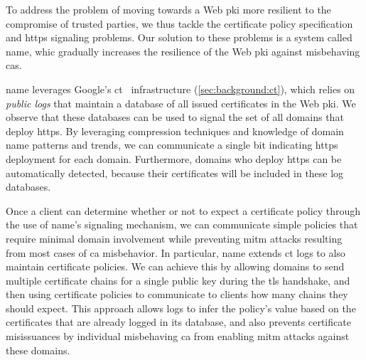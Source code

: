 
To address the problem of moving towards a Web \ac{pki} more resilient to the
compromise of trusted parties, we thus tackle the certificate policy
specification and \ac{https} signaling problems. Our solution to these problems
is a system called \ac{name}, whic gradually increases the resilience of the Web
\ac{pki} against misbehaving \acp{ca}.

\ac{name} leverages Google's \ac{ct}~\cite{rfc6698} infrastructure
(\autoref{sec:background:ct}), which relies on \emph{public logs} that maintain
a database of all issued certificates in the Web \ac{pki}. We observe that these
databases can be used to signal the set of all domains that deploy \ac{https}.
By leveraging compression techniques and knowledge of domain name patterns and
trends, we can communicate a single bit indicating \ac{https} deployment for
each domain. Furthermore, domains who deploy \ac{https} can be automatically
detected, because their certificates will be included in these log databases.

Once a client can determine whether or not to expect a certificate policy
through the use of \ac{name}'s signaling mechanism, we can communicate simple
policies that require minimal domain involvement while preventing \ac{mitm}
attacks resulting from most cases of \ac{ca} misbehavior. In particular,
\ac{name} extends \ac{ct} logs to also maintain certificate policies. We can
achieve this by allowing domains to send multiple certificate chains for a
single public key during the \ac{tls} handshake, and then using certificate
policies to communicate to clients how many chains they should expect. This
approach allows logs to infer the policy's value based on the certificates that
are already logged in its database, and also prevents certificate misissuances
by individual misbehaving \ac{ca} from enabling \ac{mitm} attacks against these
domains.

